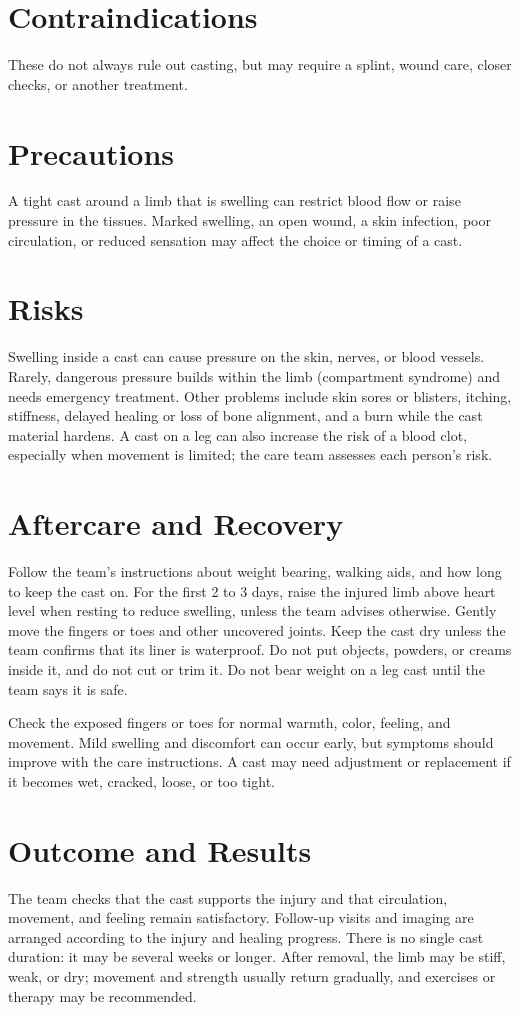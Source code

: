 \section*{Contraindications}
These do not always rule out casting, but may require a splint, wound care, closer checks, or another treatment.

\section*{Precautions}
A tight cast around a limb that is swelling can restrict blood flow or raise pressure in the tissues. Marked swelling, an open wound, a skin infection, poor circulation, or reduced sensation may affect the choice or timing of a cast.

\section*{Risks}
Swelling inside a cast can cause pressure on the skin, nerves, or blood vessels. Rarely, dangerous pressure builds within the limb (compartment syndrome) and needs emergency treatment. Other problems include skin sores or blisters, itching, stiffness, delayed healing or loss of bone alignment, and a burn while the cast material hardens. A cast on a leg can also increase the risk of a blood clot, especially when movement is limited; the care team assesses each person's risk.

\section*{Aftercare and Recovery}
Follow the team's instructions about weight bearing, walking aids, and how long to keep the cast on. For the first 2 to 3 days, raise the injured limb above heart level when resting to reduce swelling, unless the team advises otherwise. Gently move the fingers or toes and other uncovered joints. Keep the cast dry unless the team confirms that its liner is waterproof. Do not put objects, powders, or creams inside it, and do not cut or trim it. Do not bear weight on a leg cast until the team says it is safe.

Check the exposed fingers or toes for normal warmth, color, feeling, and movement. Mild swelling and discomfort can occur early, but symptoms should improve with the care instructions. A cast may need adjustment or replacement if it becomes wet, cracked, loose, or too tight.

\section*{Outcome and Results}
The team checks that the cast supports the injury and that circulation, movement, and feeling remain satisfactory. Follow-up visits and imaging are arranged according to the injury and healing progress. There is no single cast duration: it may be several weeks or longer. After removal, the limb may be stiff, weak, or dry; movement and strength usually return gradually, and exercises or therapy may be recommended.

